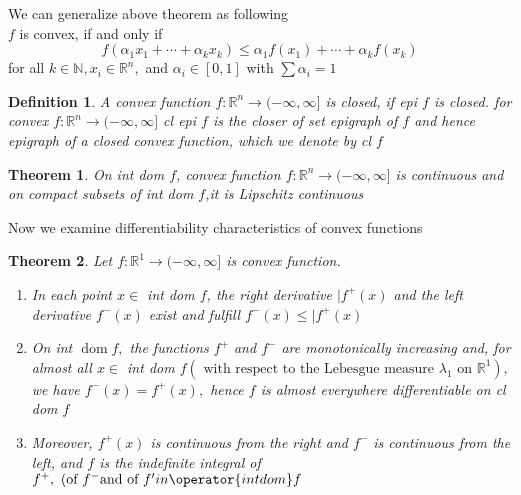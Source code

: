 \documentclass[oneside]{book}
\newtheorem{theorem}{Theorem}[section]
\newtheorem{mydef}{Definition}
\begin{document}
We can  generalize above theorem as following \\
$f$ is convex, if and only if
\begin{equation}
f\left(\alpha_{1} x_{1}+\cdots+\alpha_{k} x_{k}\right) \leq \alpha_{1} f\left(x_{1}\right)+\cdots+\alpha_{k} f\left(x_{k}\right)
\end{equation}
for all $k \in \mathbb{N}, x_{i} \in \mathbb{R}^{n},$ and $\alpha_{i} \in[0,1]$ with $\sum \alpha_{i}=1$



\begin{mydef}
 A convex function $f: \mathbb{R}^{n} \rightarrow(-\infty, \infty]$ is closed, if epi $f$ is closed.
for convex  $f: \mathbb{R}^{n} \rightarrow(-\infty, \infty]$   cl epi $f$ is the closer of set epigraph of $f$ and hence epigraph of a closed convex function, which we denote by cl $f$
\end{mydef}


\begin{theorem}
 
 On int dom $f$, convex function $f: \mathbb{R}^{n} \rightarrow(-\infty, \infty]$ is continuous and on compact subsets of int dom $f$,it is Lipschitz continuous 

\end{theorem}
\newpage
Now we examine differentiability characteristics of convex functions
\begin{theorem}

 Let $f: \mathbb{R}^{1} \rightarrow(-\infty, \infty]$ is convex function.
\begin{enumerate}
    \item 
 In each point $x \in$ int dom $f$, the right derivative $| f^{+}(x)$ and the left derivative $f^{-}(x)$ exist and fulfill $f^{-}(x) \leq | f^{+}(x)$
\\
\item
 On int $\operatorname{dom} f,$ the functions $f^{+}$ and $f^{-}$ are monotonically increasing and, for almost all
$x \in$ int dom $f\left(\text { with respect to the Lebesgue measure } \lambda_{1} \text { on } \mathbb{R}^{1}\right),$ we have $f^{-}(x)=f^{+}(x),$ hence $f$ is almost everywhere differentiable on cl dom $f$
\\
\item
 Moreover, $f^{+}(x)$
is continuous from the right and $f^{-}$ is continuous from the left, and $f$ is the indefinite integral of $ f^{+}, \text { (of } f^{-} \text {and of } f^{\prime} in \operator {int dom} f$
\end{enumerate}





 
\end{theorem}
\end{document}
